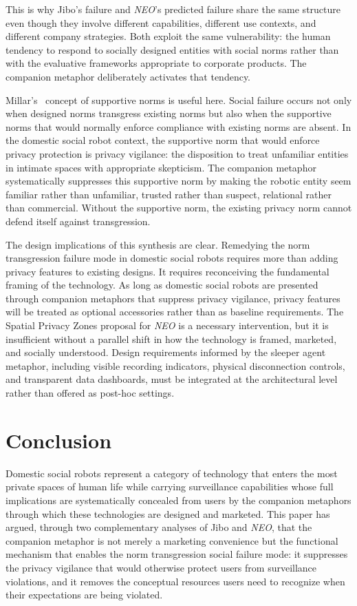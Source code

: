\documentclass{ieee-portfolio}
\newcommand{\neo}{\textit{NEO}}
\begin{document}
This is why Jibo's failure and \neo{}'s predicted failure share the same structure even though they involve different capabilities, different use contexts, and different company strategies. Both exploit the same vulnerability: the human tendency to respond to socially designed entities with social norms rather than with the evaluative frameworks appropriate to corporate products. The companion metaphor deliberately activates that tendency.

Millar's~\cite{millar_social_2020} concept of supportive norms is useful here. Social failure occurs not only when designed norms transgress existing norms but also when the supportive norms that would normally enforce compliance with existing norms are absent. In the domestic social robot context, the supportive norm that would enforce privacy protection is privacy vigilance: the disposition to treat unfamiliar entities in intimate spaces with appropriate skepticism. The companion metaphor systematically suppresses this supportive norm by making the robotic entity seem familiar rather than unfamiliar, trusted rather than suspect, relational rather than commercial. Without the supportive norm, the existing privacy norm cannot defend itself against transgression.

The design implications of this synthesis are clear. Remedying the norm transgression failure mode in domestic social robots requires more than adding privacy features to existing designs. It requires reconceiving the fundamental framing of the technology. As long as domestic social robots are presented through companion metaphors that suppress privacy vigilance, privacy features will be treated as optional accessories rather than as baseline requirements. The Spatial Privacy Zones proposal for \neo{} is a necessary intervention, but it is insufficient without a parallel shift in how the technology is framed, marketed, and socially understood. Design requirements informed by the sleeper agent metaphor, including visible recording indicators, physical disconnection controls, and transparent data dashboards, must be integrated at the architectural level rather than offered as post-hoc settings.

\section{Conclusion}
\label{sec:conclusion}

Domestic social robots represent a category of technology that enters the most private spaces of human life while carrying surveillance capabilities whose full implications are systematically concealed from users by the companion metaphors through which these technologies are designed and marketed. This paper has argued, through two complementary analyses of Jibo and \neo{}, that the companion metaphor is not merely a marketing convenience but the functional mechanism that enables the norm transgression social failure mode: it suppresses the privacy vigilance that would otherwise protect users from surveillance violations, and it removes the conceptual resources users need to recognize when their expectations are being violated.
\end{document}
